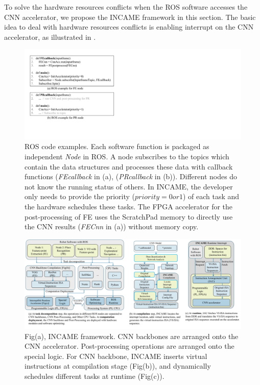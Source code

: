 \label{sec:incame}

To solve the hardware resources conflicts when the ROS software accesses the CNN accelerator, we propose the INCAME framework in this section. The basic idea to deal with hardware resources conflicts is enabling interrupt on the CNN accelerator, as illustrated in .



\begin{figure}[t]
	\centering
 \includegraphics[width=0.9\linewidth]{fig/codeexample.pdf}
 \vspace{-6mm}
 \caption{ ROS code examples. Each software function is packaged as independent \textit{Node} in ROS. A node subscribes to the topics which contain the data structures and processes these data with callback functions (\textit{FEcallback} in (a), (\textit{PRcallback} in (b)). Different nodes do not know the running status of others. In INCAME, the developer only needs to provide the priority ($priority=0 or 1$) of each task and the hardware schedules these tasks. The FPGA accelerator for the post-processing of FE uses the ScratchPad memory to directly use the CNN results (\textit{FECnn} in (a)) without memory copy. 
 }
	\label{fig:rosexample}
\end{figure}

\begin{figure}[t]
	\centering
 \includegraphics[width=0.99\linewidth]{fig/incame.pdf}
 \vspace{-1mm} 
 \caption{ Fig(a), INCAME framework. CNN backbones are arranged onto the CNN accelerator. Post-processing operations are arranged onto the special logic. For CNN backbone, INCAME inserts virtual instructions at compilation stage (Fig(b)), and dynamically schedules different tasks at runtime (Fig(c)). }
	\label{fig:incame}
\end{figure}

